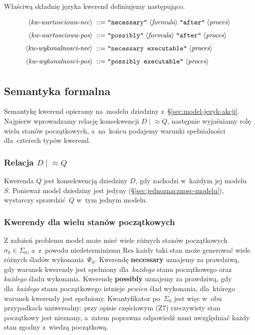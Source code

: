 \documentclass[11pt,a4paper]{article}
\newcommand{\bnfchar}[1]{\texttt{\textquotedbl#1\textquotedbl}}
\newcommand{\bnfsym}[1]{\langle \textit{#1} \rangle}
\theoremstyle{definition}
\begin{document}
Właściwą składnię języka kwerend definiujemy następująco.

\begin{align*}
    \bnfsym{kw-wartosciowa-nec} \;::=\;& \bnfchar{necessary} \; \bnfsym{formula} \; \bnfchar{after} \; \bnfsym{proces} \\[4pt]
    \bnfsym{kw-wartosciowa-pos} \;::=\;& \bnfchar{possibly} \; \bnfsym{formula} \; \bnfchar{after} \; \bnfsym{proces} \\[4pt]    
    \bnfsym{kw-wykonalnosci-nec} \;::=\;& \bnfchar{necessary executable} \; \bnfsym{proces} \\[4pt]
    \bnfsym{kw-wykonalnosci-pos} \;::=\;& \bnfchar{possibly executable} \; \bnfsym{proces} \\[4pt]    
\end{align*}

\subsection{Semantyka formalna}
\label{sec:sem-kwerend}

Semantykę kwerend opieramy na~modelu dziedziny z~\S\ref{sec:model-jezyk-akcji}.
Najpierw wprowadzamy relację konsekwencji $D \mid\!\approx Q$, następnie wyjaśniamy
rolę wielu stanów początkowych, a~na~końcu podajemy warunki spełnialności dla~czterech
typów kwerend.

\subsubsection*{Relacja \texorpdfstring{$D \mid \! \approx Q$}{D |≈ Q}}

Kwerenda $Q$ jest konsekwencją dziedziny $D$, gdy zachodzi w~każdym jej modelu~$S$. Ponieważ model dziedziny jest jedyny (\S\ref{sec:jednoznacznosc-modelu}), wystarczy sprawdzić~$Q$ w~tym jednym modelu.

\subsubsection*{Kwerendy dla wielu stanów początkowych}

Z założeń problemu model może mieć wiele różnych stanów początkowych $\sigma_0 \in \Sigma_0$, a~z~powodu niedeterminizmu $\mathrm{Res}$ każdy taki stan może generować wiele różnych śladów wykonania~$\Psi_S$. Kwerendę \textbf{necessary} uznajemy za prawdziwą, gdy warunek kwerendy jest spełniony dla~\emph{każdego} stanu początkowego oraz \emph{każdego} śladu wykonania. Kwerendę \textbf{possibly} uznajemy za prawdziwą, gdy dla~\emph{każdego} stanu początkowego istnieje \emph{pewien} ślad wykonania, dla~którego warunek kwerendy jest spełniony. Kwantyfikator po~$\Sigma_0$ jest więc w~obu przypadkach uniwersalny: przy opisie częściowym (Z7) rzeczywisty stan początkowy jest nieznany, a~zatem poprawna odpowiedź musi uwzględniać każdy stan zgodny z~wiedzą początkową.
\end{document}
